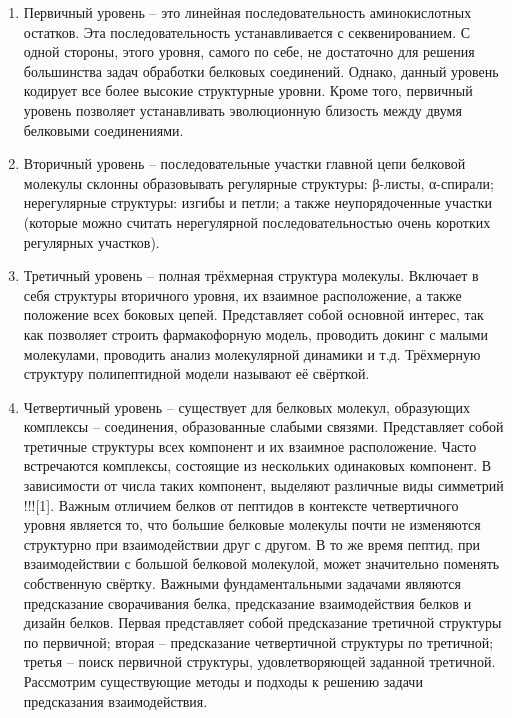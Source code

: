 \begin{enumerate}
\item Первичный уровень – это линейная последовательность аминокислотных остатков. Эта последовательность устанавливается с секвенированием. С одной стороны, этого уровня, самого по себе, не достаточно для решения большинства задач обработки белковых соединений. Однако, данный уровень кодирует все более высокие структурные уровни. Кроме того, первичный уровень позволяет устанавливать эволюционную близость между двумя белковыми соединениями.
\item Вторичный уровень – последовательные участки главной цепи белковой молекулы склонны образовывать регулярные структуры: β-листы, α-спирали; нерегулярные структуры: изгибы и петли; а также неупорядоченные участки (которые можно считать нерегулярной последовательностью очень коротких регулярных участков).
\item Третичный уровень – полная трёхмерная структура молекулы. Включает в себя структуры вторичного уровня, их взаимное расположение, а также положение всех боковых цепей. Представляет собой основной интерес, так как позволяет строить фармакофорную модель, проводить докинг с малыми молекулами, проводить анализ молекулярной динамики и т.д. Трёхмерную структуру полипептидной модели называют её свёрткой. 
\item Четвертичный уровень – существует для белковых молекул, образующих комплексы – соединения, образованные слабыми связями. Представляет собой третичные структуры всех компонент и их взаимное расположение. Часто встречаются комплексы, состоящие из нескольких одинаковых компонент. В зависимости от числа таких компонент, выделяют различные виды симметрий !!![1]. Важным отличием белков от пептидов в контексте четвертичного уровня является то, что большие белковые молекулы почти не изменяются структурно при взаимодействии друг с другом. В то же время пептид, при взаимодействии с большой белковой молекулой, может значительно поменять собственную свёртку.
Важными фундаментальными задачами являются предсказание сворачивания белка, предсказание взаимодействия белков и дизайн белков. Первая представляет собой предсказание третичной структуры по первичной; вторая – предсказание четвертичной структуры по третичной; третья – поиск первичной структуры, удовлетворяющей заданной третичной. Рассмотрим существующие методы и подходы к решению задачи предсказания взаимодействия.
\end{enumerate}
